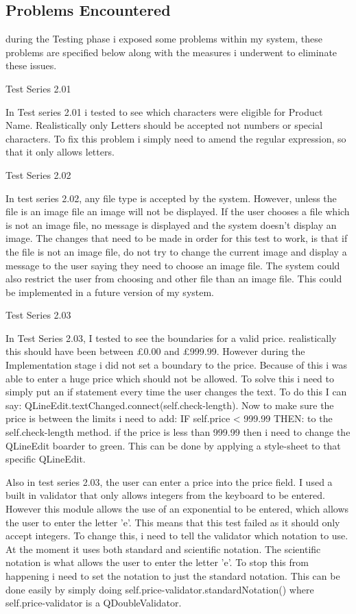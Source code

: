 \subsection{Problems Encountered}

during the Testing phase i exposed some problems within my system, these problems are specified below along with the measures i underwent to eliminate these issues. 

Test Series 2.01

In Test series 2.01 i tested to see which characters were eligible for Product Name. Realistically only Letters should be accepted not numbers or special characters. To fix this problem i simply need to amend the regular expression, so that it only allows letters. 


Test Series 2.02

In test series 2.02, any file type is accepted by the system. However, unless the file is an image file an image will not be displayed. If the user chooses a file which is not an image file, no message is displayed and the system doesn't display an image. The changes that need to be made in order for this test to work, is that if the file is not an image file, do not try to change the current image and display a message to the user saying they need to choose an image file. The system could also restrict the user from choosing and other file than an image file. This could be implemented in a future version of my system.

Test Series 2.03

In Test Series 2.03, I tested to see the boundaries for a valid price. realistically this should have been between £0.00 and £999.99. However during the Implementation stage i did not set a boundary to the price. Because of this i was able to enter a huge price which should not be allowed. To solve this i need to simply put an if statement every time the user changes the text. To do this I can say: QLineEdit.textChanged.connect(self.check-length). Now to make sure the price is between the limits i need to add: IF self.price < 999.99 THEN: to the self.check-length method. if the price is less than 999.99 then i need to change the QLineEdit boarder to green. This can be done by applying a style-sheet to that specific QLineEdit.

Also in test series 2.03, the user can enter a price into the price field. I used a built in validator that only allows integers from the keyboard to be entered. However this module allows the use of an exponential to be entered, which allows the user to enter the letter 'e'. This means that this test failed as it should only accept integers. To change this, i need to tell the validator which notation to use. At the moment it uses both standard and scientific notation. The scientific notation is what allows the user to enter the letter 'e'. To stop this from happening i need to set the notation to just the standard notation. This can be done easily by simply doing self.price-validator.standardNotation() where self.price-validator is a QDoubleValidator.


